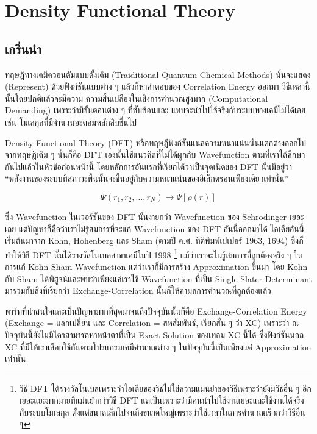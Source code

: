 
\chapter{Density Functional Theory}

\section{เกริ่นนำ}

ทฤษฎีทางเคมีควอนตัมแบบดั้งเดิม (Traiditional Quantum Chemical Methods) นั้นจะแสดง (Represent) 
ด้วยฟังก์ชันแบบต่าง ๆ แล้วก็หาคำตอบของ Correlation Energy ออกมา วิธีเหล่านี้นั้นโดยปกติแล้วจะมีความ%
ความสิ้นเปลืองในเชิงการคำนวณสูงมาก (Computational Demanding) เพราะว่ามีขั้นตอนต่าง ๆ ที่ซับซ้อนและ%
แทบจะนำไปใช้จริงกับระบบทางเคมีไม่ได้เลย เช่น โมเลกุลที่มีจำนวนอะตอมหลักสิบขึ้นไป

Density Functional Theory (DFT) หรือทฤษฎีฟังก์ชันแนลความหนาแน่นนั้นแตกต่างออกไปจากทฤษฎีเดิม ๆ 
นั่นก็คือ DFT เองนั้นใช้แนวคิดที่ไม่ได้ผูกกับ Wavefunction ตามที่เราได้ศึกษากันไปแล้วในหัวข้อก่อนหน้านี้ 
โดยหลักการอันแรกที่เรียกได้ว่าเป็นจุดเนิดของ DFT นั้นมีอยู่ว่า 
\enquote{พลังงานของระบบที่สภาวะพื้นนั้นจะขึ้นอยู่กับความหนาแน่นของอิเล็กตรอนเพียงเดียวเท่านั้น}

\begin{equation}
    \Psi(r_{1}, r_{2}, \dots, r_{N}) \rightarrow \Psi[\rho(r)]
\end{equation}

\noindent ซึ่ง Wavefunction ในเวอร์ชันของ DFT นั้นง่ายกว่า Wavefunction ของ Schr\"{o}dinger เยอะเลย
แต่ปัญหาก็คือว่าเราไม่รู้สมการที่จะแก้ Wavefunction ของ DFT อันนี้ออกมาได้ ไอเดียอันนี้เริ่มต้นมาจาก
Kohn, Hohenberg และ Sham (ตามปี ค.ศ. ที่ตีพิมพ์เปเปอร์ 1963, 1694) ซึ่งก็ทำให้วิธี
DFT นั้นได้รางวัลโนเบลสาขาเคมีในปี 1998%
\footnote{วิธี DFT ได้รางวัลโนเบลเพราะว่าไอเดียของวิธีไม่ใช่ความแม่นยำของวิธีเพราะว่ายังมีวิธีอื่น ๆ 
อีกเยอะแยะมากมายที่แม่นยำกว่าวิธี DFT แต่เป็นเพราะว่ามีคนนำไปใช้งานเยอะและใช้งานได้จริงกับระบบโมเลกุล%
ตั้งแต่ขนาดเล็กไปจนถึงขนาดใหญ่เพราะว่าใช้เวลาในการคำนวณเร็วกว่าวิธีอื่น ๆ} 
แม้ว่าเราจะไม่รู้สมการที่ถูกต้องจริง ๆ ในการแก้ Kohn-Sham Wavefunction แต่ว่าเราก็มีการสร้าง 
Approximation ขึ้นมา โดย Kohn กับ Sham ได้พิสูจน์และพบว่าเพียงแค่เราใช้ Wavefunction ที่เป็น 
Single Slater Determinant มารวมกับสิ่งที่เรียกว่า Exchange-Correlation นั้นก็ให้ค่าผลการคำนวณที่ถูกต้องแล้ว

พาร์ทที่น่าสนใจและเป็นปัญหามากที่สุดมาจนถึงปัจจุบันนั้นก็คือ Exchange-Correlation Energy 
(Exchange = แลกเปลี่ยน และ Correlation = สหสัมพันธ์, เรียกสั้น ๆ ว่า XC)  เพราะว่า 
ณ ปัจจุบันนี้ยังไม่มีใครสามารถหาหน้าตาที่เป็น Exact Solution ของเทอม XC นี้ได้ ซึ่งฟังก์ชันนอล XC 
ที่มีให้เราเลือกใช้กันตามโปรแกรมเคมีคำนวณต่าง ๆ ในปัจจุบันนี้เป็นเพียงแค่ Approximation เท่านั้น

